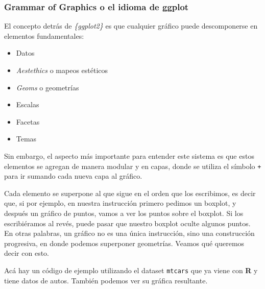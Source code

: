 \documentclass[
  letterpaper,
  DIV=11,
  numbers=noendperiod,
  oneside]{scrreprt}
\begin{document}
\hypertarget{grammar-of-graphics-o-el-idioma-de-ggplot}{%
\subsubsection{Grammar of Graphics o el idioma de
ggplot}\label{grammar-of-graphics-o-el-idioma-de-ggplot}}

El concepto detrás de \emph{\{ggplot2\}} es que cualquier gráfico puede
descomponerse en elementos fundamentales:

\begin{itemize}
\item
  Datos
\item
  \emph{Aestethics} o mapeos estéticos
\item
  \emph{Geoms} o geometrías
\item
  Escalas
\item
  Facetas
\item
  Temas
\end{itemize}

Sin embargo, el aspecto más importante para entender este sistema es que
estos elementos se agregan de manera modular y en capas, donde se
utiliza el símbolo \texttt{+} para ir sumando cada nueva capa al
gráfico.

Cada elemento se superpone al que sigue en el orden que los escribimos,
es decir que, si por ejemplo, en nuestra instrucción primero pedimos un
boxplot, y después un gráfico de puntos, vamos a ver los puntos sobre el
boxplot. Si los escribiéramos al revés, puede pasar que nuestro boxplot
oculte algunos puntos. En otras palabras, un gráfico no es una única
instrucción, sino una construcción progresiva, en donde podemos
superponer geometrías. Veamos qué queremos decir con esto.

Acá hay un código de ejemplo utilizando el dataset \texttt{mtcars} que
ya viene con \textbf{R} y tiene datos de autos. También podemos ver su
gráfica resultante.
\end{document}

